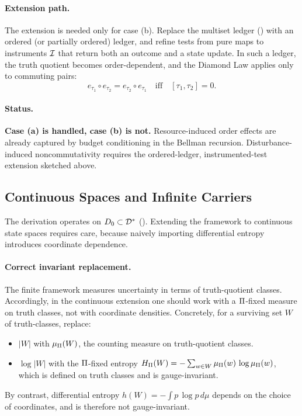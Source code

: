 \paragraph{Extension path.}
The extension is needed only for case (b).  Replace the multiset ledger
() with an ordered (or partially ordered) ledger, and refine tests
from pure maps to instruments $\mathcal{I}$ that return both an outcome and
a state update.  In such a ledger, the truth quotient becomes
order-dependent, and the Diamond Law applies only to commuting pairs:
\[
  e_{\tau_1} \circ e_{\tau_2} = e_{\tau_2} \circ e_{\tau_1}
  \quad\text{iff}\quad [\tau_1, \tau_2] = 0.
\]

\paragraph{Status.}
\textbf{Case (a) is handled, case (b) is not.}  Resource-induced order
effects are already captured by budget conditioning in the Bellman
recursion.  Disturbance-induced noncommutativity requires the
ordered-ledger, instrumented-test extension sketched above.

\subsection{Continuous Spaces and Infinite Carriers}
\label{app:oq:continuous}

The derivation operates on $D_0 \subset \mathcal{D}^*$ ().
Extending the framework to continuous state spaces requires care, because
naively importing differential entropy introduces coordinate dependence.

\paragraph{Correct invariant replacement.}
The finite framework measures uncertainty in terms of truth-quotient
classes.  Accordingly, in the continuous extension one should work with a
$\Pi$-fixed measure on truth classes, not with coordinate densities.
Concretely, for a surviving set $W$ of truth-classes, replace:
\begin{itemize}[nosep]
  \item $|W|$ with $\mu_{\Pi}(W)$, the counting measure on
        truth-quotient classes.
  \item $\log |W|$ with the $\Pi$-fixed entropy
        $H_{\Pi}(W) = -\sum_{w \in W} \mu_{\Pi}(w)\,\log \mu_{\Pi}(w)$,
        which is defined on truth classes and is gauge-invariant.
\end{itemize}
By contrast, differential entropy
$h(W) = -\int p\,\log p\,d\mu$ depends on the choice of coordinates,
and is therefore not gauge-invariant.

